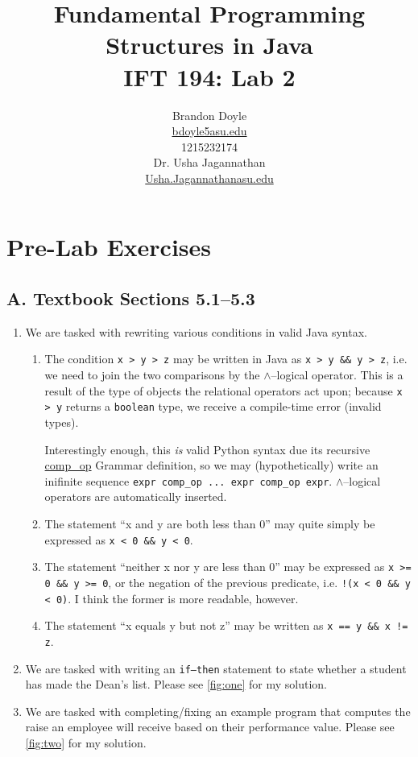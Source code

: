 \documentclass[leqno, 11pt]{article}
\title{\vspace{6ex}Fundamental Programming Structures in Java\\
  \Large IFT 194: Lab 2}
\author{Brandon Doyle\\
\href{mailto:bdoyle@asu.edu}{bdoyle5\at{}asu.edu}\\
1215232174\\[1em]
Dr. Usha Jagannathan\\
\href{mailto:Usha.Jagannathan@asu.edu}{Usha.Jagannathan\at{}asu.edu}}
\begin{document}
\begin{titlepage}
\clearpage\maketitle
\thispagestyle{empty}
\end{titlepage}
\section*{Pre-Lab Exercises}
\subsection*{A. Textbook Sections 5.1--5.3}
\begin{enumerate}
  \item We are tasked with rewriting various conditions in valid Java syntax. 
        \begin{enumerate}
          \item The condition \texttt{x > y > z} may be written in Java as \texttt{x > y \&\& y > z}, i.e. we need to join the two comparisons by the $\wedge$--logical operator. This is a result of the type of objects the relational operators act upon; because \texttt{x > y} returns a \texttt{boolean} type, we receive a compile-time error (invalid types).
    
                Interestingly enough, this \textit{is} valid Python syntax due its recursive \href{https://github.com/python/cpython/blob/master/Grammar/Grammar#L93}{comp\_op} Grammar definition, so we may (hypothetically) write an inifinite sequence \texttt{expr comp\_op ... expr comp\_op expr}. $\wedge$--logical operators are automatically inserted.
              \item The statement ``x and y are both less than 0'' may quite simply be expressed as \texttt{x < 0 \&\& y < 0}.
              \item The statement ``neither x nor y are less than 0'' may be expressed as \texttt{x >= 0 \&\& y >= 0}, or the negation of the previous predicate, i.e. \texttt{!(x < 0 \&\& y < 0)}. I think the former is more readable, however.
              \item The statement ``x equals y but not z'' may be written as \texttt{x == y \&\& x != z}.
        \end{enumerate}
  \item We are tasked with writing an \texttt{if--then} statement to state whether a student has made the Dean's list. Please see \autoref{fig:one} for my solution.
  \item We are tasked with completing/fixing an example program that computes the raise an employee will receive based on their performance value. Please see \autoref{fig:two} for my solution.
\end{enumerate}
\end{document}
